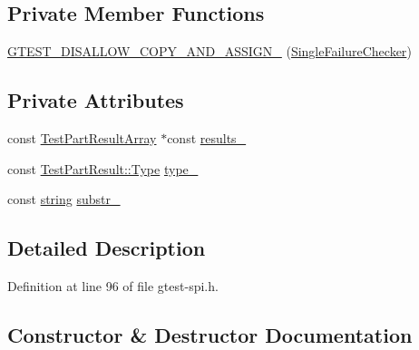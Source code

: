 \subsection*{Private Member Functions}
\begin{DoxyCompactItemize}
\item 
\hyperlink{classtesting_1_1internal_1_1SingleFailureChecker_a381cef530568cc08d07dfa2a5dcfc233}{G\+T\+E\+S\+T\+\_\+\+D\+I\+S\+A\+L\+L\+O\+W\+\_\+\+C\+O\+P\+Y\+\_\+\+A\+N\+D\+\_\+\+A\+S\+S\+I\+G\+N\+\_\+} (\hyperlink{classtesting_1_1internal_1_1SingleFailureChecker}{Single\+Failure\+Checker})
\end{DoxyCompactItemize}
\subsection*{Private Attributes}
\begin{DoxyCompactItemize}
\item 
const \hyperlink{classtesting_1_1TestPartResultArray}{Test\+Part\+Result\+Array} $\ast$const \hyperlink{classtesting_1_1internal_1_1SingleFailureChecker_af6216677e2186e9481088daf57c17d21}{results\+\_\+}
\item 
const \hyperlink{classtesting_1_1TestPartResult_a65ae656b33fdfdfffaf34858778a52d5}{Test\+Part\+Result\+::\+Type} \hyperlink{classtesting_1_1internal_1_1SingleFailureChecker_a8fc33138c357b2a6ede3698eb57548a7}{type\+\_\+}
\item 
const \hyperlink{namespacetesting_1_1internal_a8e8ff5b11e64078831112677156cb111}{string} \hyperlink{classtesting_1_1internal_1_1SingleFailureChecker_a2003215f5f3147726e0b3bb4c8954d71}{substr\+\_\+}
\end{DoxyCompactItemize}


\subsection{Detailed Description}


Definition at line 96 of file gtest-\/spi.\+h.



\subsection{Constructor \& Destructor Documentation}
\mbox{\label{classtesting_1_1internal_1_1SingleFailureChecker_a6d350d385526c97c9982e928f5f8fb56}} 
